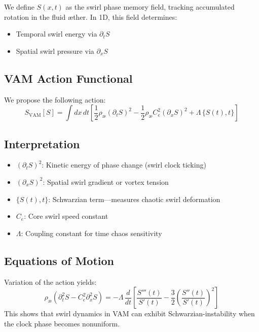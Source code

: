 \documentclass[11pt]{article}
\begin{document}
We define $S(x,t)$ as the swirl phase memory field, tracking accumulated rotation in the fluid æther. In 1D, this field determines:
\begin{itemize}
\item Temporal swirl energy via $\partial_t S$
\item Spatial swirl pressure via $\partial_x S$
\end{itemize}

\subsection*{VAM Action Functional}

We propose the following action:
\begin{equation}
\boxed{
S_{\text{VAM}}[S] = \int dx \, dt \left[
\frac{1}{2} \rho_{\text{\ae}} (\partial_t S)^2
- \frac{1}{2} \rho_{\text{\ae}} C_e^2 (\partial_x S)^2
+ \Lambda \, \{ S(t), t \}
\right]
}
\end{equation}

\subsection*{Interpretation}
\begin{itemize}
\item $(\partial_t S)^2$: Kinetic energy of phase change (swirl clock ticking)
\item $(\partial_x S)^2$: Spatial swirl gradient or vortex tension
    \item $\{ S(t), t \}$: Schwarzian term—measures chaotic swirl deformation
\item $C_e$: Core swirl speed constant
\item $\Lambda$: Coupling constant for time chaos sensitivity
\end{itemize}

\subsection*{Equations of Motion}

Variation of the action yields:
\begin{equation}
\rho_{\text{\ae}} (\partial_t^2 S - C_e^2 \partial_x^2 S) = - \Lambda \, \frac{d}{dt} \left[ \frac{S'''(t)}{S'(t)} - \frac{3}{2} \left( \frac{S''(t)}{S'(t)} \right)^2 \right]
\end{equation}
This shows that swirl dynamics in VAM can exhibit Schwarzian-instability when the clock phase becomes nonuniform.
\end{document}

